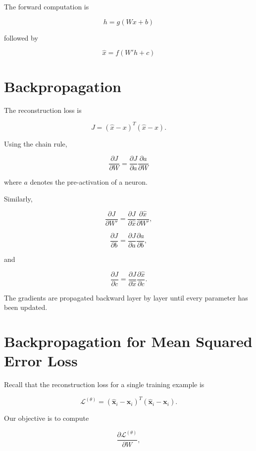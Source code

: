 \documentclass{article}
\begin{document}
	The forward computation is
	
	\[
	\boxed{
		h
		=
		g(Wx+b)
	}
	\]
	
	followed by
	
	\[
	\boxed{
		\hat{x}
		=
		f(W'h+c)
	}
	\]
	
	
	\section{Backpropagation}
	
	The reconstruction loss is
	
	\[
	J
	=
	(\hat{x}-x)^T(\hat{x}-x).
	\]
	
	Using the chain rule,
	
	\[
	\boxed{
		\frac{\partial J}{\partial W}
		=
		\frac{\partial J}{\partial a}
		\frac{\partial a}{\partial W}
	}
	\]
	
	where \(a\) denotes the pre-activation of a neuron.
	
	Similarly,
	
	\[
	\frac{\partial J}{\partial W'}
	=
	\frac{\partial J}{\partial \hat{x}}
	\frac{\partial \hat{x}}{\partial W'},
	\]
	
	\[
	\frac{\partial J}{\partial b}
	=
	\frac{\partial J}{\partial a}
	\frac{\partial a}{\partial b},
	\]
	
	and
	
	\[
	\frac{\partial J}{\partial c}
	=
	\frac{\partial J}{\partial \hat{x}}
	\frac{\partial \hat{x}}{\partial c}.
	\]
	
	The gradients are propagated backward layer by layer until every parameter has been updated.
	
	\section{Backpropagation for Mean Squared Error Loss}
	
	Recall that the reconstruction loss for a single training example is
	
	\[
	\mathcal{L}^{(\theta)}
	=
	(\hat{\mathbf{x}}_i-\mathbf{x}_i)^T
	(\hat{\mathbf{x}}_i-\mathbf{x}_i).
	\]
	
	Our objective is to compute
	
	\[
	\frac{\partial \mathcal{L}^{(\theta)}}{\partial W},
	\]
	
\end{document}
